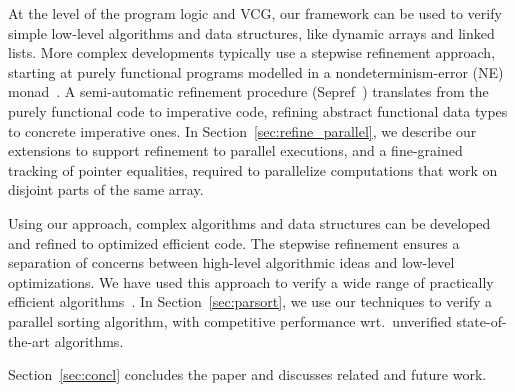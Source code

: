 \documentclass[sn-mathphys,Numbered]{sn-jnl}
\theoremstyle{thmstyleone}%
\theoremstyle{definition}%
\theoremstyle{thmstylethree}%
\begin{document}
At the level of the program logic and VCG, our framework can be used to verify simple low-level algorithms and data structures,
like dynamic arrays and linked lists. More complex developments typically use a stepwise refinement approach,
starting at purely functional programs modelled in a nondeterminism-error (NE) monad~\cite{LaTu12}.
A semi-automatic refinement procedure (Sepref~\cite{La15,La19-llvm}) translates from the purely functional
code to imperative code, refining abstract functional data types to concrete imperative ones.
In Section~\ref{sec:refine_parallel}, we describe our extensions to support refinement to parallel executions,
and a fine-grained tracking of pointer equalities, required to parallelize computations that work on
disjoint parts of the same array.

Using our approach, complex algorithms and data structures can be developed and
refined to optimized efficient code. The stepwise refinement ensures a separation of concerns
between high-level algorithmic ideas and low-level optimizations. We have used this approach to
verify a wide range of practically efficient algorithms~\cite{ELNN13,BrLa18,WiLa18,La17_CADE,La17_SAT,FBL18,La14,LaSe16,LaSe19,La20}.
In Section~\ref{sec:parsort}, we use our techniques to verify a parallel sorting algorithm,
with competitive performance wrt.\ unverified state-of-the-art algorithms.

Section~\ref{sec:concl} concludes the paper and discusses related and future work.
\end{document}
